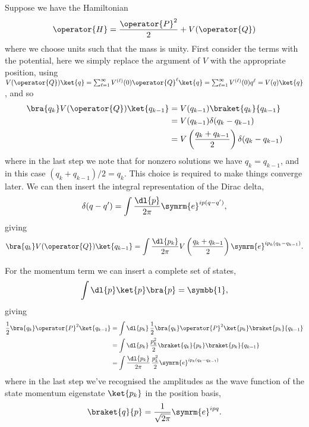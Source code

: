 \documentclass[fleqn]{NotesClass}
\newcommand{\e}{\symrm{e}}
\newcommand{\ident}{\symbb{1}}
\begin{document}
    Suppose we have the Hamiltonian
    \begin{equation}
        \operator{H} = \frac{\operator{P}^2}{2} + V(\operator{Q})
    \end{equation}
    where we choose units such that the mass is unity.
    First consider the terms with the potential, here we simply replace the argument of \(V\) with the appropriate position, using \(V(\operator{Q}) \ket{q} = \sum_{\ell = 1}^{\infty} V^{(\ell)}(0) \operator{Q}^\ell \ket{q} = \sum_{\ell = 1}^{\infty} V^{(\ell)}(0)q^\ell = V(q)\ket{q}\), and so
    \begin{align}
        \bra{q_k} V(\operator{Q}) \ket{q_{k - 1}} &= V(q_{k-1}) \braket{q_k}{q_{k-1}}\\
        &= V(q_{k - 1})\delta(q_k - q_{k-1})\\
        &= V\left( \frac{q_k + q_{k-1}}{2} \right)\delta(q_k - q_{k-1})
    \end{align}
    where in the last step we note that for nonzero solutions we have \(q_k = q_{k - 1}\), and in this case \((q_k + q_{k-1})/2 = q_k\).
    This choice is required to make things converge later.
    We can then insert the integral representation of the Dirac delta,
    \begin{equation}
        \delta(q - q') = \int \frac{\dl{p}}{2\pi} \e^{ip(q - q')},
    \end{equation}
    giving
    \begin{equation}
        \bra{q_k} V(\operator{Q}) \ket{q_{k-1}} = \int \frac{\dl{p_k}}{2\pi} V\left( \frac{q_k + q_{k-1}}{2} \right) \e^{ip_k(q_k - q_{k-1})}.
    \end{equation}
    
    For the momentum term we can insert a complete set of states,
    \begin{equation}
        \int \dl{p} \ket{p}\bra{p} = \ident,
    \end{equation}
    giving
    \begin{align}
        \frac{1}{2}\bra{q_k} \operator{P}^2 \ket{q_{k-1}} &= \int \dl{p_k} \, \frac{1}{2} \bra{q_k}\operator{P}^2 \ket{p_k}\braket{p_k}{q_{k-1}}\\
        &= \int \dl{p_k} \, \frac{p_k^2}{2} \braket{q_k}{p_k} \braket{p_k}{q_{k-1}}\\
        &= \int \frac{\dl{p_k}}{2\pi} \, \frac{p_k^2}{2} \e^{ip_k(q_k - q_{k-1})}
    \end{align}
    where in the last step we've recognised the amplitudes as the wave function of the state momentum eigenstate \(\ket{p_k}\) in the position basis,
    \begin{equation}
        \braket{q}{p} = \frac{1}{\sqrt{2\pi}} \e^{ipq}.
    \end{equation}
    
\end{document}
